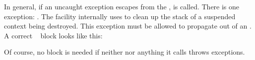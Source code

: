 \label{exceptions}

In general, if an uncaught exception escapes from the \entryfn,
 is called. There is one exception: \unwindex. The \fiber
facility internally uses \unwindex to clean up the stack of a suspended context
being destroyed. This exception must be allowed to propagate out of an \entryfn.\\

A correct \entryfn\  block looks like this:

Of course, no  block is needed if neither \entryfn\xspace nor
anything it calls throws exceptions.
